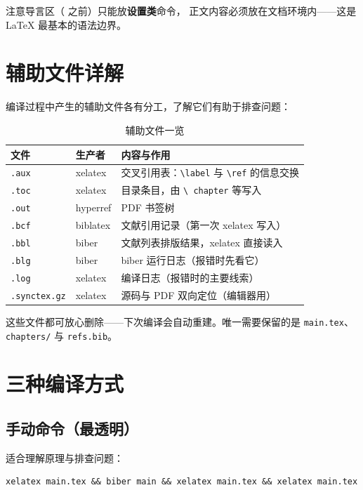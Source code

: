 注意导言区（\verb|| 之前）只能放\textbf{设置类}命令，
正文内容必须放在文档环境内——这是 LaTeX 最基本的语法边界。

\section{辅助文件详解}

编译过程中产生的辅助文件各有分工，了解它们有助于排查问题：

\begin{table}[htbp]
  \centering
  \caption{辅助文件一览}\label{tab:auxfiles}
  \begin{tabular}{llp{7.5cm}}
    \toprule
    文件 & 生产者 & 内容与作用 \\
    \midrule
    \texttt{.aux} & xelatex & 交叉引用表：\texttt{\textbackslash label}
          与 \texttt{\textbackslash ref} 的信息交换 \\
    \texttt{.toc} & xelatex & 目录条目，由 \texttt{\textbackslash
          chapter} 等写入 \\
    \texttt{.out} & hyperref & PDF 书签树 \\
    \texttt{.bcf} & biblatex & 文献引用记录（第一次 xelatex 写入）\\
    \texttt{.bbl} & biber & 文献列表排版结果，xelatex 直接读入 \\
    \texttt{.blg} & biber & biber 运行日志（报错时先看它）\\
    \texttt{.log} & xelatex & 编译日志（报错时的主要线索）\\
    \texttt{.synctex.gz} & xelatex & 源码与 PDF 双向定位（编辑器用）\\
    \bottomrule
  \end{tabular}
\end{table}

这些文件都可放心删除——下次编译会自动重建。唯一需要保留的是
\texttt{main.tex}、\texttt{chapters/} 与 \texttt{refs.bib}。

\section{三种编译方式}

\subsection{手动命令（最透明）}

适合理解原理与排查问题：
\begin{verbatim}
xelatex main.tex && biber main && xelatex main.tex && xelatex main.tex
\end{verbatim}

